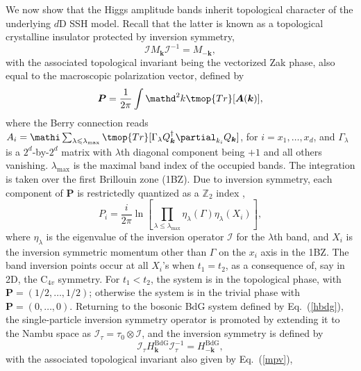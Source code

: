 We now show that the Higgs amplitude bands inherit topological character of the underlying $d$D SSH model.
Recall that the latter is known as a topological crystalline insulator protected by inversion symmetry,
\begin{equation}
  \mathcal{I}M_{\bm{k}} \mathcal{I}^{- 1}  =M_{-\bm{k}}, \label{is0}
\end{equation}
with the associated topological invariant being the vectorized Zak phase,
also equal to the macroscopic polarization vector,
defined by \cite{Liu2017}
\begin{equation}
  \bm{P}= \frac{1}{2 \pi} \int \mathd^2 k \tmop{Tr} [\bm{A}
  (\bm{k})], \label{mpv}
\end{equation}
where the Berry connection reads $A_i = \mathi \sum_{\lambda\leq\lambda_{\text{max}}} \tmop{Tr} [\Gamma_\lambda Q^{\dag}_{\bm{k}} \partial_{k_i} Q_{\bm{k}}]$,
for $i=x_1,\dots,x_d$,
and $\Gamma_\lambda$ is a $2^d$-by-$2^d$ matrix with $\lambda$th diagonal component being $+ 1$ and all others vanishing.
$\lambda_{\text{max}}$ is the maximal band index of the occupied bands.
The integration is taken over the first Brillouin zone (1BZ).
Due to inversion symmetry,
each component of $\bm{P}$ is restrictedly quantized as a $\mathbb{Z}_2$ index \cite{Fang2012},
\begin{equation}
  P_i = \frac{i}{2 \pi} \ln \left[ \prod_{\lambda\leq\lambda_{\text{max}}} \eta_{\lambda} (\Gamma)
  \eta_{\lambda} (X_i) \right], \label{p}
\end{equation}
where $\eta_{\lambda}$ is the eigenvalue of the inversion operator $\mathcal I$ for the $\lambda$th band,
and $X_i$ is the inversion symmetric momentum other than $\Gamma$ on the $x_i$ axis in the 1BZ.
The band inversion points occur at all $X_i$'s when $t_1 = t_2$, as a consequence of, say in 2D, the $\mathrm{C}_{4v}$ symmetry.
For $t_1 < t_2$,
the system is in the topological phase,
with $\bm{P}= \left(1/2,\dots, 1/2 \right)$;
otherwise the system is in the trivial phase with $\bm{P}= (0,\dots, 0)$.
Returning to the bosonic BdG system defined by Eq.~(\ref{hbdg}),
the single-particle inversion symmetry operator is promoted by extending it to the Nambu space as $\mathcal{I}_{\tau} = \tau_0 \otimes \mathcal{I}$,
and the inversion symmetry is defined by
\begin{equation}
  \mathcal{I}_{\tau} H^{\text{BdG}}_{\bm{k}} \mathcal{I}_{\tau}^{- 1} = H^{\text{BdG}}_{-\bm{k}},\label{is}
\end{equation}
with the associated topological invariant also given by Eq.~(\ref{mpv}),
